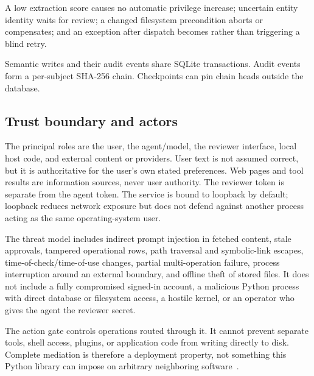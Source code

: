  A low extraction score causes no automatic privilege increase; uncertain entity identity waits for review; a changed filesystem precondition aborts or compensates; and an exception after dispatch becomes  rather than triggering a blind retry.

 Semantic writes and their audit events share SQLite transactions. Audit events form a per-subject SHA-256 chain. Checkpoints can pin chain heads outside the database.

\subsection{Trust boundary and actors}

The principal roles are the user, the agent/model, the reviewer interface, local host code, and external content or providers. User text is not assumed correct, but it is authoritative for the user's own stated preferences. Web pages and tool results are information sources, never user authority. The reviewer token is separate from the agent token. The service is bound to loopback by default; loopback reduces network exposure but does not defend against another process acting as the same operating-system user.

The threat model includes indirect prompt injection in fetched content, stale approvals, tampered operational rows, path traversal and symbolic-link escapes, time-of-check/time-of-use changes, partial multi-operation failure, process interruption around an external boundary, and offline theft of stored files. It does not include a fully compromised signed-in account, a malicious Python process with direct database or filesystem access, a hostile kernel, or an operator who gives the agent the reviewer secret.

 The action gate controls operations routed through it. It cannot prevent separate tools, shell access, plugins, or application code from writing directly to disk. Complete mediation is therefore a deployment property, not something this Python library can impose on arbitrary neighboring software~\cite{saltzer1975protection}.
